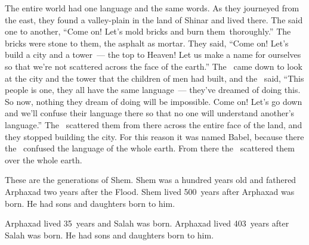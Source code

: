 
\begin{inparaenum}
   The entire world had one language and the same words.%
   As they journeyed from the east, they found a valley-plain in the land of Shinar and lived there.%
   The said one to another, ``Come on! Let's mold bricks and burn them\understood\ thoroughly.'' The bricks were stone to them, the asphalt as mortar.%
   They said, ``Come on! Let's build a city and a tower~--- the top to Heaven! Let us make a name for ourselves so that we're not scattered across the face of the earth.''%
   The \lord\ came down to look at the city and the tower that the children of men had built,%
   and the \lord\ said, ``This people is one, they all have the same language~--- they've dreamed of doing this. So now, nothing they dream of doing will be impossible.%
   Come on! Let's go down and we'll confuse their language there so that no one will understand another's language.''%
   The \lord\ scattered them from there across the entire face of the land, and they stopped building the city.%
   For this reason it was named Babel, because there the \lord\ confused the language of the whole earth. From there the \lord\ scattered them over the whole earth.%
  
   These are the generations of Shem. Shem was a hundred years old and fathered Arphaxad two years after the Flood.%
   Shem lived 500~years after Arphaxad was born. He had sons and daughters born to him.%
  
   Arphaxad lived 35~years and Salah was born.%
   Arphaxad lived 403~years after Salah was born. He had sons and daughters born to him.%
  

\end{inparaenum}
